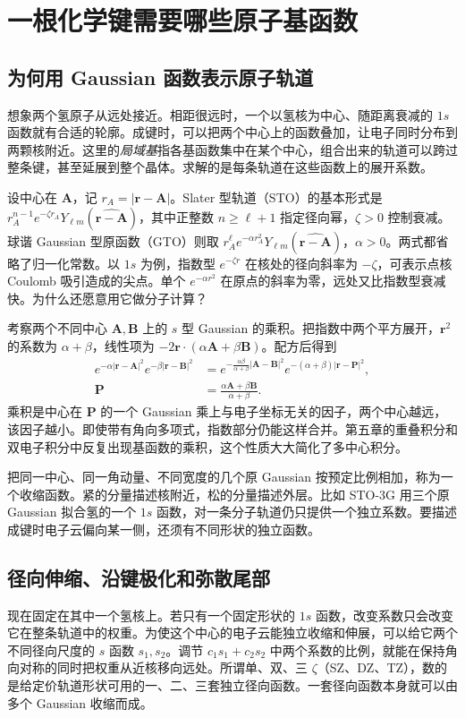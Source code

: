 \section{一根化学键需要哪些原子基函数}\label{solids:atomic-basis}
\subsection{为何用 Gaussian 函数表示原子轨道}
想象两个氢原子从远处接近。相距很远时，一个以氢核为中心、随距离衰减的 $1s$ 函数就有合适的轮廓。成键时，可以把两个中心上的函数叠加，让电子同时分布到两颗核附近。这里的\emph{局域基}指各基函数集中在某个中心，组合出来的轨道可以跨过整条键，甚至延展到整个晶体。求解的是每条轨道在这些函数上的展开系数。

设中心在 $\bm A$，记 $r_A=|\bm r-\bm A|$。Slater 型轨道（STO）的基本形式是 $r_A^{n-1}e^{-\zeta r_A}Y_{\ell m}(\widehat{\bm r-\bm A})$，其中正整数 $n\ge\ell+1$ 指定径向幂，$\zeta>0$ 控制衰减。球谐 Gaussian 型原函数（GTO）则取 $r_A^\ell e^{-\alpha r_A^2}Y_{\ell m}(\widehat{\bm r-\bm A})$，$\alpha>0$。两式都省略了归一化常数。以 $1s$ 为例，指数型 $e^{-\zeta r}$ 在核处的径向斜率为 $-\zeta$，可表示点核 Coulomb 吸引造成的尖点。单个 $e^{-\alpha r^2}$ 在原点的斜率为零，远处又比指数型衰减快。为什么还愿意用它做分子计算？

考察两个不同中心 $\bm A,\bm B$ 上的 $s$ 型 Gaussian 的乘积。把指数中两个平方展开，$\bm r^2$ 的系数为 $\alpha+\beta$，线性项为 $-2\bm r\cdot(\alpha\bm A+\beta\bm B)$。配方后得到
\begin{align}
 e^{-\alpha|\bm r-\bm A|^2}e^{-\beta|\bm r-\bm B|^2}
 &=e^{-\frac{\alpha\beta}{\alpha+\beta}|\bm A-\bm B|^2}
   e^{-(\alpha+\beta)|\bm r-\bm P|^2},\nonumber\\[-2pt]
 \bm P&=\frac{\alpha\bm A+\beta\bm B}{\alpha+\beta}.\label{solids:gaussian-product}
\end{align}
乘积是中心在 $\bm P$ 的一个 Gaussian 乘上与电子坐标无关的因子，两个中心越远，该因子越小。即使带有角向多项式，指数部分仍能这样合并。第五章的重叠积分和双电子积分中反复出现基函数的乘积，这个性质大大简化了多中心积分。

把同一中心、同一角动量、不同宽度的几个原 Gaussian 按预定比例相加，称为一个收缩函数。紧的分量描述核附近，松的分量描述外层。比如 STO-3G 用三个原 Gaussian 拟合氢的一个 $1s$ 函数，对一条分子轨道仍只提供一个独立系数。要描述成键时电子云偏向某一侧，还须有不同形状的独立函数。

\subsection{径向伸缩、沿键极化和弥散尾部}
现在固定在其中一个氢核上。若只有一个固定形状的 $1s$ 函数，改变系数只会改变它在整条轨道中的权重。为使这个中心的电子云能独立收缩和伸展，可以给它两个不同径向尺度的 $s$ 函数 $s_1,s_2$。调节 $c_1s_1+c_2s_2$ 中两个系数的比例，就能在保持角向对称的同时把权重从近核移向远处。所谓单、双、三 $\zeta$（SZ、DZ、TZ），数的是给定价轨道形状可用的一、二、三套独立径向函数。一套径向函数本身就可以由多个 Gaussian 收缩而成。

